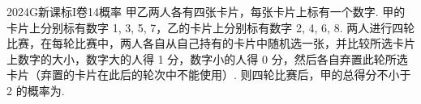 
\begin{problem}{2024}{G}{新课标I卷}{14}{概率}
甲乙两人各有四张卡片，每张卡片上标有一个数字. 甲的卡片上分别标有数字 1, 3, 5, 7，乙的卡片上分别标有数字 2, 4, 6, 8. 两人进行四轮比赛，在每轮比赛中，两人各自从自己持有的卡片中随机选一张，并比较所选卡片上数字的大小，数字大的人得 1 分，数字小的人得 0 分，然后各自弃置此轮所选卡片（弃置的卡片在此后的轮次中不能使用）. 则四轮比赛后，甲的总得分不小于 2 的概率为\underline{\hspace{4em}}.
\end{problem}